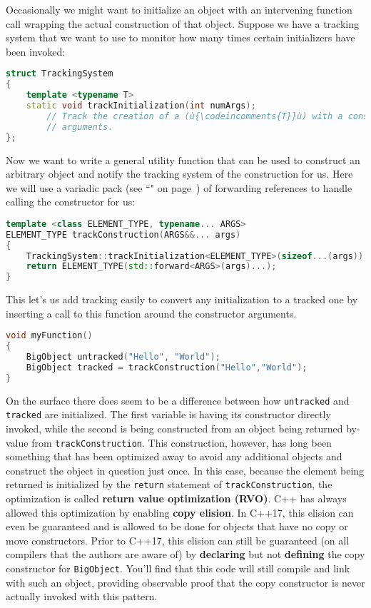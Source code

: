 Occasionally we might want to initialize an object with an intervening
function call wrapping the actual construction of that object. Suppose
we have a tracking system that we want to use to monitor how many times
certain initializers have been invoked:

\begin{lstlisting}[language=C++]
struct TrackingSystem
{
    template <typename T>
    static void trackInitialization(int numArgs);
        // Track the creation of a (ù{\codeincomments{T}}ù) with a constructor taking (ù{\codeincomments{numArgs}}ù)
        // arguments.
};
\end{lstlisting}
    
\noindent Now we want to write a general utility function that can be used to
construct an arbitrary object and notify the tracking system of the
construction for us. Here we will use a variadic pack (see
``" on page~\pageref{variable-templates}) of forwarding references to handle
calling the constructor for us:

\begin{lstlisting}[language=C++]
template <class ELEMENT_TYPE, typename... ARGS>
ELEMENT_TYPE trackConstruction(ARGS&&... args)
{
    TrackingSystem::trackInitialization<ELEMENT_TYPE>(sizeof...(args));
    return ELEMENT_TYPE(std::forward<ARGS>(args)...);
}
\end{lstlisting}
    
\noindent This let's us add tracking easily to convert any initialization to a
tracked one by inserting a call to this function around the constructor
arguments.

\begin{lstlisting}[language=C++]
void myFunction()
{
    BigObject untracked("Hello", "World");
    BigObject tracked = trackConstruction("Hello","World");
}
\end{lstlisting}
    
\noindent On the surface there does seem to be a difference between how
\texttt{untracked} and \texttt{tracked} are initialized. The first
variable is having its constructor directly invoked, while the second is
being constructed from an object being returned by-value from
\texttt{trackConstruction}. This construction, however, has long been
something that has been optimized away to avoid any additional objects
and construct the object in question just once. In this case, because
the element being returned is initialized by the \texttt{return}
statement of \texttt{trackConstruction}, the optimization is called
\textbf{return value optimization (RVO)}. C++ has always
allowed this optimization by enabling \textbf{copy elision}. In C++17,
this elision can even be guaranteed and is allowed to be done for
objects that have no copy or move constructors. Prior to C++17, this
elision can still be guaranteed (on all compilers that the authors are
aware of) by \textbf{declaring} but not \textbf{defining} the copy
constructor for \texttt{BigObject}. You'll find that this code will
still compile and link with such an object, providing observable proof
that the copy constructor is never actually invoked with this pattern.

